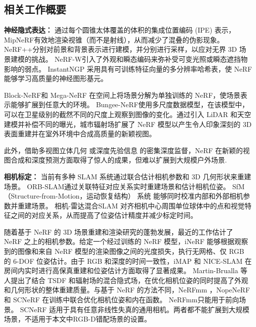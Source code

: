 \subsection{相关工作概要}
\textbf{神经隐式表达：}
通过每个圆锥太体覆盖的体积的集成位置编码 (IPE) 表示，MipNeRF\cite{barron_mip-nerf_2021}有效地渲染视锥（而不是射线），从而减少了混叠的伪影现象。 NeRF++\cite{zhang_nerf_2020}分别对前景和背景表示进行建模，并分别进行采样，以应对无界 3D 场景建模的挑战。 NeRF-W\cite{martin-brualla_nerf_2021}引入了外观和瞬态编码来弥补受可变光照或瞬态遮挡物影响的弱点。 InstantNGP\cite{muller_instant_2022} 采用具有可训练特征向量的多分辨率哈希表，使 NeRF 能够学习高质量的神经图形基元。

Block-NeRF\cite{tancik_block-nerf_2022}和 Mega-NeRF\cite{turki_mega-nerf_2022} 在空间上将场景分解为单独训练的 NeRF，使场景表示能够扩展到任意大的环境。 Bungee-NeRF\cite{xiangli_bungeenerf_2022}使用多尺度数据模型，在该模型中，可以在卫星级别的截然不同的尺度上观察到图像的变化。通过引入 LiDAR 和天空建模并补偿不同的曝光，城市辐射场\cite{rematas_urban_2022}扩展了 NeRF 模型以产生令人印象深刻的 3D 表面重建并在室外环境中合成高质量的新颖视图。

此外，借助多视图立体几何\cite{deng_depth-supervised_2022} 或深度先验信息\cite{roessle_dense_2022} 的密集深度监督，NeRF 在新颖的视图合成和深度预测方面取得了惊人的成果，但难以扩展到大规模户外场景.

\textbf{相机标定：}
当前有多种 SLAM 系统通过联合估计相机参数和 3D 几何形状来重建场景。 ORB-SLAM\cite{mur-artal_orb-slam_2015}通过关联特征对应关系实时重建场景和估计相机位姿。 SfM（Structure-from-Motion，运动恢复结构） 系统\cite{schonberger_structure--motion_2016, chen_uncertainty-driven_2023} 能够同时校准内部和外部相机参数并重建场景。 相机-雷达混合SLAM\cite{kong_vmap_2023, deng_nerf-loam_2023} 对齐相机中心周围单位球体中的点和视觉特征之间的对应关系，从而提高了位姿估计精度并减少标定时间。

随着基于 NeRF 的 3D 场景重建和渲染研究的蓬勃发展，最近的工作估计了 NeRF 之上的相机参数。给定一个经过训练的 NeRF 模型，iNeRF\cite{yen-chen_inerf_2021} 能够根据观察到的图像和来自 NeRF 模型的渲染图像之间的光度损失，执行无网格、仅 RGB 的 6-DOF 位姿估计。由于 RGB 和深度的时间一致性，iMAP\cite{sucar_imap_2021} 和 NICE-SLAM\cite{zhu_nice-slam_2022} 在房间内实时进行高保真重建和位姿估计方面取得了显著成果。 Martin-Brualla 等人提出了结合 TSDF 和辐射场的混合隐式场\cite{azinovic_neural_2022}，在优化相机位姿的同时提高了外观和几何形状的整体重建质量。与基于 NeRF 的方法不同，NeRFmm \cite{wang_nerf--_2022}，NopeNeRF\cite{bian_nope-nerf_2022} 和 SCNeRF \cite{jeong_self-calibrating_2021} 在训练中联合优化相机位姿和内在函数。 NeRFmm\cite{wang_nerf--_2022}只能用于前向场景。 SCNeRF\cite{jeong_self-calibrating_2021} 适用于具有任意非线性失真的通用相机。两者都不能扩展到大规模场景，不适用于本文中RGB-D错配场景的设置。


